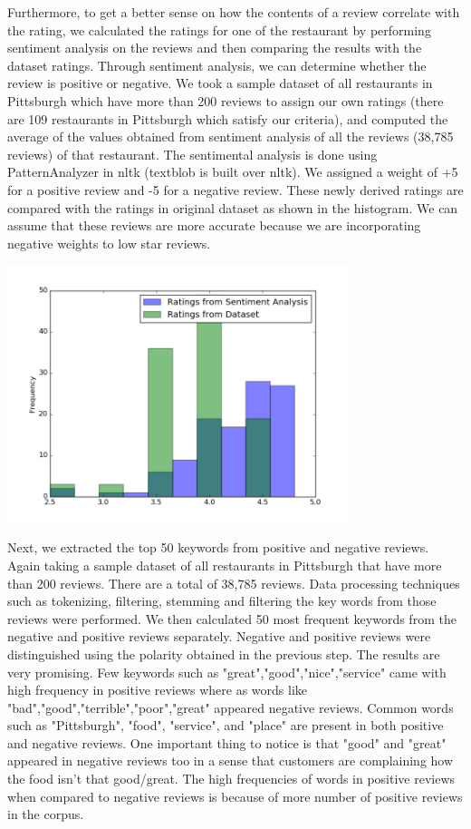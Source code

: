 \documentclass{neu_handout}
\begin{document}
Furthermore, to get a better sense on how the contents of a review correlate with the rating, we calculated the ratings for one of the restaurant by performing sentiment analysis on the reviews and then comparing the results with the dataset ratings. Through sentiment analysis, we can determine whether the review is positive or negative. We took a sample dataset of all restaurants in Pittsburgh which have more than 200 reviews to assign our own ratings (there are 109 restaurants in Pittsburgh which satisfy our criteria), and computed the average of the values obtained from sentiment analysis of all the reviews (38,785 reviews) of that restaurant. The sentimental analysis is done using PatternAnalyzer in nltk (textblob is built over nltk). We assigned a weight of +5 for a positive review and -5 for a negative review. These newly derived ratings are compared with the ratings in original dataset as shown in the histogram. We can assume that these reviews are more accurate because we are incorporating negative weights to low star reviews.

\begin{center}
\includegraphics[width=100mm,scale=0.5]{sentimentanalysis}
\end{center}

Next, we extracted the top 50 keywords from positive and negative reviews. Again taking a sample dataset of all restaurants in Pittsburgh that have more than 200 reviews. There are a total of 38,785 reviews. Data processing techniques such as tokenizing, filtering, stemming and filtering the key words from those reviews were performed. We then calculated 50 most frequent keywords from the negative and positive reviews separately. Negative and positive reviews were distinguished using the polarity obtained in the previous step.
The results are very promising. Few keywords such as "great","good","nice","service" came with high frequency in positive reviews where as words like "bad","good","terrible","poor","great" appeared negative reviews. Common words such as "Pittsburgh", "food", "service", and "place" are present in both positive and negative reviews. One important thing to notice is that "good" and "great" appeared in negative reviews too in a sense that customers are complaining how the food isn't that good/great. The high frequencies of words in positive reviews when compared to negative reviews is because of more number of positive reviews in the corpus.
\end{document}
